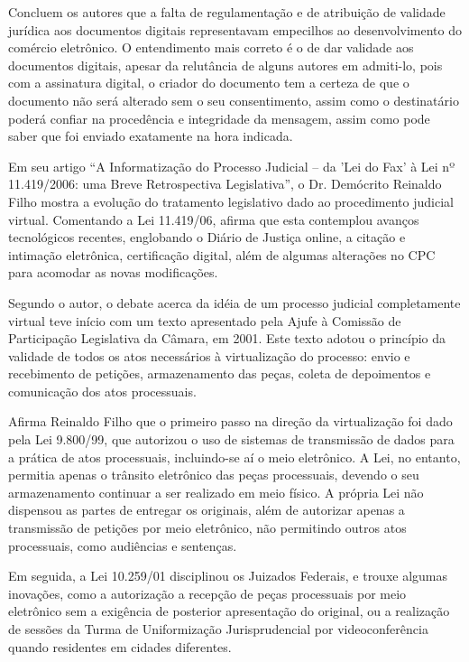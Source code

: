 	Concluem os autores que a falta de regulamentação e de
  atribuição de validade jurídica aos documentos digitais
  representavam empecilhos ao desenvolvimento do comércio
  eletrônico. O entendimento mais correto é o de dar validade aos
  documentos digitais, apesar da relutância de alguns autores em
  admiti-lo, pois com a assinatura digital, o criador do
  documento tem a certeza de que o documento não será alterado
  sem o seu consentimento, assim como o destinatário poderá
  confiar na procedência e integridade da mensagem, assim como
  pode saber que foi enviado exatamente na hora indicada. \par
	
	Em seu artigo “A Informatização do Processo Judicial – da 'Lei
  do Fax' à Lei nº 11.419/2006: uma Breve Retrospectiva
      Legislativa”, o Dr. Demócrito Reinaldo Filho mostra a
      evolução do tratamento legislativo dado ao procedimento
      judicial virtual. Comentando a Lei 11.419/06, afirma que
      esta contemplou avanços tecnológicos recentes, englobando o
      Diário de Justiça online, a citação e intimação eletrônica,
      certificação digital, além de algumas alterações no CPC
      para acomodar as novas modificações.\par
	
	Segundo o autor, o debate acerca da idéia de um processo
  judicial completamente virtual teve início com um texto
  apresentado pela Ajufe à Comissão de Participação Legislativa
  da Câmara, em 2001. Este texto adotou o princípio da validade
  de todos os atos necessários à virtualização do processo: envio
  e recebimento de petições, armazenamento das peças, coleta de
  depoimentos e comunicação dos atos processuais.\par
	
	Afirma Reinaldo Filho que o primeiro passo na direção da
  virtualização foi dado pela Lei 9.800/99, que autorizou o uso
  de sistemas de transmissão de dados para a prática de atos
  processuais, incluindo-se aí o meio eletrônico. A Lei, no
  entanto, permitia apenas o trânsito eletrônico das peças
  processuais, devendo o seu armazenamento continuar a ser
  realizado em meio físico. A própria Lei não dispensou as partes
  de entregar os originais, além de autorizar apenas a
  transmissão de petições por meio eletrônico, não permitindo
  outros atos processuais, como audiências e sentenças.\par
	
	Em seguida, a Lei 10.259/01 disciplinou os Juizados Federais, e
  trouxe algumas inovações, como a autorização a recepção de
  peças processuais por meio eletrônico sem a exigência de
  posterior apresentação do original, ou a realização de sessões
  da Turma de Uniformização Jurisprudencial por videoconferência
  quando residentes em cidades diferentes. \par
	
